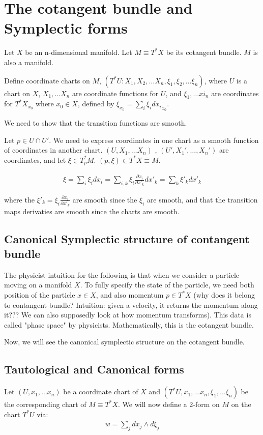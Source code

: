 \documentclass[11pt]{book}
\begin{document}
\section{The cotangent bundle and Symplectic forms}

Let $X$ be an n-dimensional manifold. Let $M \equiv T^*X$ be its cotangent
bundle.  $M$ is also a manifold.

Define coordinate charts on $M$, $(T^*U: X_1, X_2, \dots X_n, \xi_1, \xi_2, \dots \xi_n)$,
where $U$ is a chart on $X$, $X_1, \dots X_n$ are coordinate functions for $U$,
and $\xi_1, \dots xi_n$ are coordinates for $T^*X_{x_0}$ where $x_0 \in X$, defined
by $\xi_{x_0} = \sum_i \xi_i {dx_i}_{x_0}$.

We need to show that the transition functions are smooth.

Let $p \in U \cap U'$. We need to express coordinates in one chart
as a smooth function of coordinates in another chart. $(U, X_1, \dots X_n)$
, $(U', X_1', \dots, X_n')$ are coordinates, and let $\xi \in T_p^* M$.
$(p, \xi) \in T^*X \equiv M$.


\begin{align*}
    \xi = \sum_i \xi_i dx_i = \sum_{i, k} \xi_i \frac{\partial x_i}{\partial x'_k} dx'_k = \sum_k \xi'_k dx'_k
\end{align*}

where the $\xi'_k = \xi_i \frac{\partial x_i}{\partial x'_k}$ are smooth since
the $\xi_i$ are smooth, and that the transition maps derivaties are smooth
since the charts are smooth.

\subsection{Canonical Symplectic structure of contangent bundle}

The physicist intuition for the following is that when we consider
a particle moving on a manifold $X$. To fully specify the state of the
particle, we need both position of the particle $x \in X$, and also
momentum $p \in T^*X$ (why does it belong to contangent bundle? Intuition:
given a velocity, it returns the momentum along it??? We can also supposedly
look at how momentum transforms).
This data is called "phase space" by physicists. Mathematically, this
is the cotangent bundle.

Now, we will see the canonical symplectic structure on the cotangent bundle.
\subsection{Tautological and Canonical forms}
Let $(U, x_1, \dots x_n)$ be a coordinate chart of $X$ and 
$(T^*U, x_1, \dots x_n, \xi_1, \dots \xi_n)$ 
be the corresponding chart of $M \equiv T^*X$. We will now define a 2-form
on $M$ on the chart $T^*U$ via:
\begin{align*}
    w = \sum_j dx_j \wedge d\xi_j
\end{align*}
\end{document}

